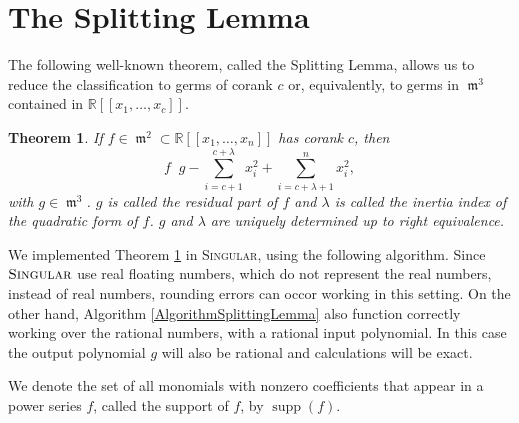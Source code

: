 \documentclass[noend]{amsproc}
\newtheorem{theorem}{Theorem}
\theoremstyle{definition}
\DeclareMathOperator{\requiv}{\overset{r}{\sim}}
\DeclareMathOperator{\m}{\mathfrak{m}}
\DeclareMathOperator{\supp}{supp}
\begin{document}
\section{The Splitting Lemma}\label{TheSplittingLemma}
The following well-known theorem, called the Splitting Lemma, allows us to
reduce the classification to germs of corank $c$ or, equivalently, to germs
in $\m^3$ contained in $\mathbb R[[x_1,\ldots,x_c]]$.


\begin{theorem}\label{SplittingLemma}
If $f\in \m^2\subset \mathbb R[[x_1,\ldots,x_n]]$ has corank $c$, then
\[ f\requiv g-\sum_{i=c+1}^{c+\lambda} x_i^2+\sum_{i=c+\lambda+1}^nx_i^2,\]
with $g\in \m^3$. $g$ is called the residual part of $f$ and $\lambda$
is called
the inertia index of the quadratic form of $f$. $g$ and $\lambda$ are
uniquely determined up to right equivalence.
\end{theorem}

We implemented Theorem \ref{SplittingLemma} in \textsc{Singular},
using the following algorithm. Since $\textsc{Singular}$ use real floating
numbers, which do not represent the real numbers, instead of real numbers,
rounding errors can occor working in this setting. On the other hand, Algorithm
\ref{AlgorithmSplittingLemma} also function correctly working over the rational
numbers, with a rational input polynomial. In this case the output polynomial
$g$ will also be rational and calculations will be exact.

We denote the set of all monomials with nonzero coefficients that appear in a
power series $f$, called the support of $f$, by $\supp(f)$.
\end{document}
